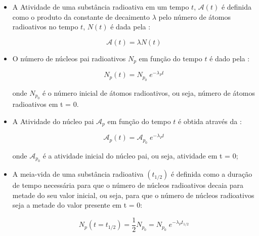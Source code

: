 \documentclass[11pt,a4paper]{article}
\begin{document}
            \begin{itemize}
                \item A Atividade de uma substância radioativa em um tempo $t$, $\mathcal{A}(t)$ é definida como o produto da constante de decaimento $\lambda$ pelo número de átomos radioativos no tempo $t$, $N(t)$ é dada pela :

                    \begin{equation}
                        \mathcal{A} (t) = \lambda N(t)
                    \end{equation}

                \item O número de núcleos pai radioativos $N_p$ em função do tempo $t$ é dado pela :
                    
                    \begin{equation}
                        N_p(t) = N_{p_0} \; e^{-\lambda_P t}
                    \end{equation}

                    onde $N_{p_0}$ é o número inicial de átomos radioativos, ou seja, número de átomos radioativos em t = 0.

                \item A Atividade do núcleo pai $\mathcal{A}_p$ em função do tempo $t$ é obtida através da :
                
                    \begin{equation}
                        \mathcal{A}_p(t) = \mathcal{A}_{p_0} \; e^{-\lambda_P t}
                    \end{equation}
                    
                    onde $\mathcal{A}_{p_0}$ é a atividade inicial do núcleo pai, ou seja, atividade em t = 0;

                \item A meia-vida de uma substância radioativa $(t_{1/2})$ é definida como a duração de tempo necessária para que o número de núcleos radioativos decaia para metade do seu valor inicial, ou seja, para que o número de núcleos radioativos seja a metade do valor presente em t = 0:
                
                    \begin{equation}
                        N_p(t = t_{1/2}) = \frac{1}{2} N_{p_0} = N_{p_0} \; e^{-\lambda_P t_{1/2}}
                    \end{equation}
                

\end{itemize}
\end{document}

